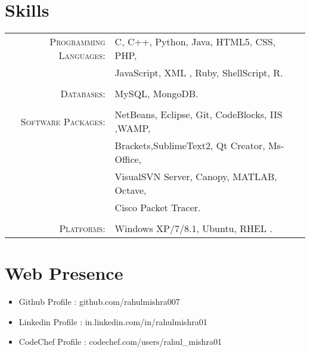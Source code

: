 \documentclass[a4paper,10pt]{article}
\begin{document}
\section{Skills }
\begin{tabular}{rl}
 \textsc{Programming Languages:}& C, C++, Python, Java, HTML5, CSS, PHP,\\ & JavaScript, XML , Ruby, ShellScript, R.
 \\ &\\
  \textsc{Databases:}&  MySQL, MongoDB.
 \\ &\\
\textsc{Software Packages:}& NetBeans, Eclipse, Git, CodeBlocks, IIS ,WAMP, \\& Brackets,SublimeText2, Qt Creator, Ms-Office, \\ & VisualSVN Server, Canopy, MATLAB, Octave,\\ & Cisco Packet Tracer.\\&\\ 
\textsc{Platforms:}& Windows XP/7/8.1, Ubuntu, RHEL .\\
\end{tabular}

\section{Web Presence }
\begin{itemize}
  \item Github Profile : github.com/rahulmishra007
  \item Linkedin Profile : in.linkedin.com/in/rahulmishra01
  \item CodeChef Profile : codechef.com/users/rahul\_mishra01
\end{itemize}
\end{document}
